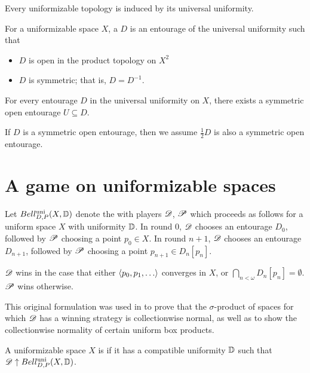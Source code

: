 \begin{thm}
  Every uniformizable topology is induced by its universal uniformity.
\end{thm}

\begin{defn}
  For a uniformizable space $X$, a  $D$ is an
  entourage of the universal uniformity such that
  \begin{itemize}
    \item $D$ is open in the product topology on $X^2$
    \item $D$ is symmetric; that is, $D=D^{-1}$.
  \end{itemize}
\end{defn}

\begin{thm}
  For every entourage $D$ in the universal uniformity on $X$, there exists a
  symmetric open entourage $U\subseteq D$.
\end{thm}

If $D$ is a symmetric open entourage, then we assume $\frac{1}{2}D$ is
also a symmetric open entourage.

\section{A game on uniformizable spaces}

\begin{game}
  Let $Bell_{D,P}^{\textrm{uni}}(X, \mathbb{D})$ denote the  with
  players $\mathscr{D}$, $\mathscr{P}$ which
  proceeds as follows for a uniform space $X$ with uniformity $\mathbb{D}$. In round
  $0$, $\mathscr{D}$ chooses an entourage $D_0$, followed by $\mathscr{P}$ choosing a point
  $p_0\in X$. In round $n+1$, $\mathscr{D}$ chooses an entourage $D_{n+1}$, followed
  by $\mathscr{P}$ choosing a point $p_{n+1}\in D_n[p_n]$.

  $\mathscr{D}$ wins in the case that either $\<p_0,p_1,\dots\>$ converges in $X$,
  or $\bigcap_{n<\omega}D_n[p_n] = \emptyset$. $\mathscr{P}$ wins otherwise.
\end{game}

This original formulation was used in \cite{MR3239205} to prove that the
$\sigma$-product of spaces for which $\mathscr{D}$ has a winning strategy is
collectionwise normal, as well as to show the collectionwise normality
of certain uniform box products.

\begin{defn}
  A uniformizable space $X$ is  if it has a compatible uniformity
  $\mathbb{D}$ such that $\mathscr{D}\uparrow Bell_{D,P}^{\textrm{uni}}(X,\mathbb{D})$.
\end{defn}

